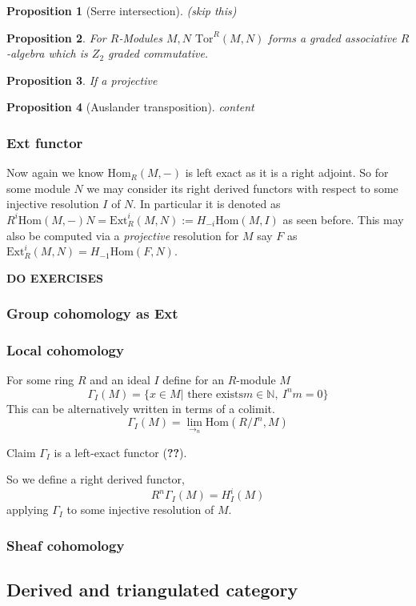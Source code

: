 \documentclass[12pt]{article}
\numberwithin{equation}{section}
\newcommand{\N}{\mathbb{N}}
\newcommand{\Hom}{{\mathrm{Hom}}}
\newtheorem{proposition}{Proposition}[section]
\begin{document}
	\begin{proposition}[Serre intersection](skip this)
	\end{proposition}
	
	\begin{proposition}
		For $R$-Modules $M,N$ \( \mathrm{Tor}^R(M,N) \) forms a graded associative $R$-algebra which is $Z_2$ graded commutative.
	\end{proposition}
	\begin{proposition}
		If a projective
	\end{proposition}
	\begin{proposition}[Auslander transposition]
		content
	\end{proposition}
	\subsubsection{Ext functor}
	Now again we know $\Hom_R(M,-)$ is left exact as it is a right adjoint. So for some module $N$ we may consider its right derived functors with respect to some injective resolution $I$ of $N$. In particular it is denoted as $R^i \Hom(M,-)N= \mathrm{Ext}_R^i(M,N):= H_{-i} \Hom(M,I)$ as seen before. This may also be computed via a \textit{projective} resolution for $M$ say $F$ as $\mathrm{Ext}_R^i (M,N)= H_{-1} \Hom(F,N)$.
	
	
	\textbf{DO EXERCISES}
	\subsubsection{Group cohomology as Ext}
	
	\subsubsection{Local cohomology}
	For some ring $R$ and an ideal $I$ define for an $R$-module $M$ $$\Gamma_I(M)=\{x \in M | \text{ there exists} m \in \N,\ I^n m =0\}$$
	This can be alternatively written in terms of a colimit.\[ \Gamma_I(M)= \lim_{\to_n} \Hom (R/I^n, M) \]
	
	Claim $\Gamma_I $ is a left-exact functor (\textbf{??}).
	
	So we define a right derived functor, \[ R^n \Gamma_I(M)=H_I^i(M) \] applying $\Gamma_I $ to some injective resolution of $M$.
	\subsubsection{Sheaf cohomology}
	
	\subsection{Derived and triangulated category}
	
\end{document}
